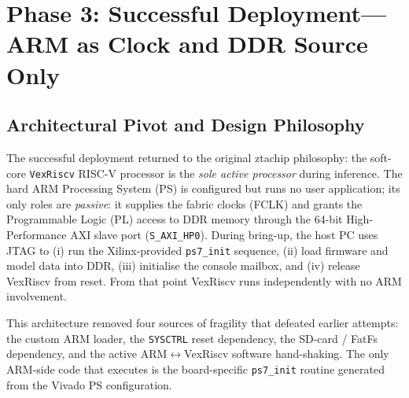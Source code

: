 


%
%


\section{Phase 3: Successful Deployment---ARM as Clock and DDR Source Only}

\subsection{Architectural Pivot and Design Philosophy}

The successful deployment returned to the original ztachip philosophy: the soft-core
\texttt{VexRiscv} RISC-V processor is the \emph{sole active processor} during inference. The hard
ARM Processing System (PS) is configured but runs no user application; its only roles are
\emph{passive}: it supplies the fabric clocks (FCLK) and grants the Programmable Logic (PL) access
to DDR memory through the 64-bit High-Performance AXI slave port (\texttt{S\_AXI\_HP0}). During
bring-up, the host PC uses JTAG to (i) run the Xilinx-provided \texttt{ps7\_init} sequence,
(ii) load firmware and model data into DDR, (iii) initialise the console mailbox, and (iv) release
VexRiscv from reset. From that point VexRiscv runs independently with no ARM involvement.

This architecture removed four sources of fragility that defeated earlier attempts: the custom ARM
loader, the \texttt{SYSCTRL} reset dependency, the SD-card / FatFs dependency, and the active
ARM$\leftrightarrow$VexRiscv software hand-shaking. The only ARM-side code that executes is the
board-specific \texttt{ps7\_init} routine generated from the Vivado PS configuration.

